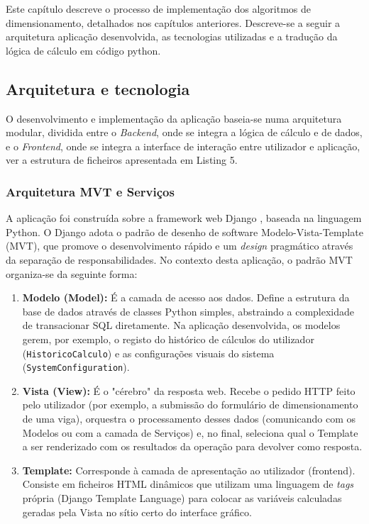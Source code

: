 
Este capítulo descreve o processo de implementação dos algoritmos de dimensionamento, detalhados nos capítulos anteriores. 
Descreve-se a seguir a arquitetura aplicação desenvolvida, as tecnologias utilizadas e a tradução da lógica de cálculo em código python.

\subsection{Arquitetura e tecnologia}
O desenvolvimento e implementação da aplicação baseia-se numa arquitetura modular, dividida entre o \textit{Backend}, onde se integra a lógica de cálculo e de dados, 
e o \textit{Frontend}, onde se integra a interface de interação entre utilizador e aplicação, ver a estrutura de ficheiros apresentada em Listing 5.

\subsubsection{Arquitetura MVT e Serviços}
A aplicação foi construída sobre a framework web Django \cite{DjangoDocs}, baseada na linguagem Python. 
O Django adota o padrão de desenho de software Modelo-Vista-Template (MVT), que promove o desenvolvimento rápido e um \textit{design} pragmático através da separação de responsabilidades. 
No contexto desta aplicação, o padrão MVT organiza-se da seguinte forma:

    \begin{enumerate}
        \item \textbf{Modelo (Model):} É a camada de acesso aos dados. Define a estrutura da base de dados através de classes Python simples, abstraindo a complexidade de transacionar SQL diretamente. Na aplicação desenvolvida, os modelos gerem, por exemplo, o registo do histórico de cálculos do utilizador (\texttt{HistoricoCalculo}) e as configurações visuais do sistema (\texttt{SystemConfiguration}).
        \item \textbf{Vista (View):} É o "cérebro" da resposta web. Recebe o pedido HTTP feito pelo utilizador (por exemplo, a submissão do formulário de dimensionamento de uma viga), orquestra o processamento desses dados (comunicando com os Modelos ou com a camada de Serviços) e, no final, seleciona qual o Template a ser renderizado com os resultados da operação para devolver como resposta.
        \item \textbf{Template:} Corresponde à camada de apresentação ao utilizador (frontend). Consiste em ficheiros HTML dinâmicos que utilizam uma linguagem de \textit{tags} própria (Django Template Language) para colocar as variáveis calculadas geradas pela Vista no sítio certo do interface gráfico.
    \end{enumerate}

